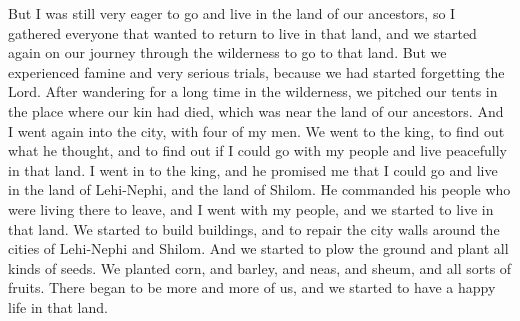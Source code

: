 But I was still very eager to go and live in the land of our ancestors, so I gathered everyone that wanted to return to live in that land, and we started again on our journey through the wilderness to go to that land. But we experienced famine and very serious trials, because we had started forgetting the Lord.
\bverse \iffalse Nevertheless, after many days' wandering in the wilderness we pitched our tents in the place where our brethren were slain, which was near to the land of our fathers. \fi
After wandering for a long time in the wilderness, we pitched our tents in the place where our kin had died, which was near the land of our ancestors.
\bverse \iffalse And it came to pass that I went again with four of my men into the city, in unto the king, that I might know of the disposition of the king, and that I might know if I might go in with my people and possess the land in peace. \fi
And I went again into the city, with four of my men. We went to the king, to find out what he thought, and to find out if I could go with my people and live peacefully in that land.
\bverse \iffalse And I went in unto the king, and he covenanted with me that I might possess the land of Lehi-Nephi, and the land of Shilom. \fi
I went in to the king, and he promised me that I could go and live in the land of Lehi-Nephi, and the land of Shilom.
\bverse \iffalse And he also commanded that his people should depart out of the land, and I and my people went into the land that we might possess it. \fi
He commanded his people who were living there to leave, and I went with my people, and we started to live in that land.
\bverse \iffalse And we began to build buildings, and to repair the walls of the city, yea, even the walls of the city of Lehi-Nephi, and the city of Shilom. \fi
We started to build buildings, and to repair the city walls around the cities of Lehi-Nephi and Shilom.
\bverse \iffalse And we began to till the ground, yea, even with all manner of seeds, with seeds of corn, and of wheat, and of barley, and with neas, and with sheum, and with seeds of all manner of fruits; and we did begin to multiply and prosper in the land. \fi
And we started to plow the ground and plant all kinds of seeds. We planted corn, and barley, and neas, and sheum, and all sorts of fruits. There began to be more and more of us, and we started to have a happy life in that land.
\bverse \iffalse Now it was the cunning and the craftiness of king Laman, to bring my people into bondage, that he yielded up the land that we might possess it. \fi
